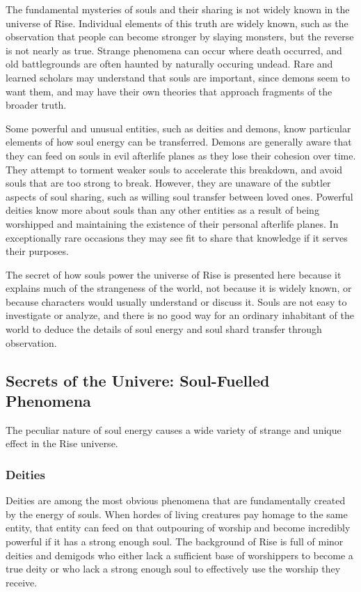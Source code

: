             The fundamental mysteries of souls and their sharing is not widely known in the universe of Rise.
            Individual elements of this truth are widely known, such as the observation that people can become stronger by slaying monsters, but the reverse is not nearly as true.
            Strange phenomena can occur where death occurred, and old battlegrounds are often haunted by naturally occuring undead.
            Rare and learned scholars may understand that souls are important, since demons seem to want them, and may have their own theories that approach fragments of the broader truth.

            Some powerful and unusual entities, such as deities and demons, know particular elements of how soul energy can be transferred.
            Demons are generally aware that they can feed on souls in evil afterlife planes as they lose their cohesion over time.
            They attempt to torment weaker souls to accelerate this breakdown, and avoid souls that are too strong to break.
            However, they are unaware of the subtler aspects of soul sharing, such as willing soul transfer between loved ones.
            Powerful deities know more about souls than any other entities as a result of being worshipped and maintaining the existence of their personal afterlife planes.
            In exceptionally rare occasions they may see fit to share that knowledge if it serves their purposes.

            The secret of how souls power the universe of Rise is presented here because it explains much of the strangeness of the world, not because it is widely known, or because characters would usually understand or discuss it.
            Souls are not easy to investigate or analyze, and there is no good way for an ordinary inhabitant of the world to deduce the details of soul energy and soul shard transfer through observation.

    \subsection{Secrets of the Univere: Soul-Fuelled Phenomena}

        The peculiar nature of soul energy causes a wide variety of strange and unique effect in the Rise universe.

        \subsubsection{Deities}
            Deities are among the most obvious phenomena that are fundamentally created by the energy of souls.
            When hordes of living creatures pay homage to the same entity, that entity can feed on that outpouring of worship and become incredibly powerful if it has a strong enough soul.
            The background of Rise is full of minor deities and demigods who either lack a sufficient base of worshippers to become a true deity or who lack a strong enough soul to effectively use the worship they receive.

